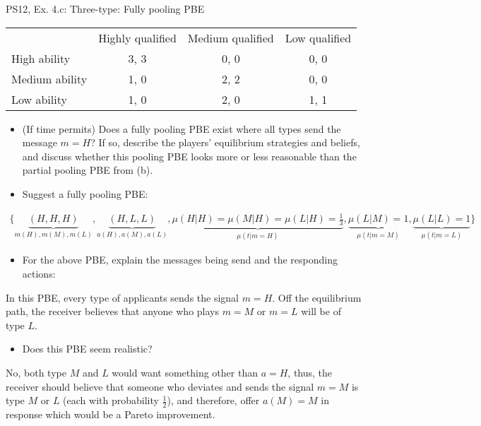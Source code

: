 \begin{frame}{PS12, Ex. 4.c: Three-type: Fully pooling PBE}
    \begin{table}
      \begin{tabular}{l|c|c|c|}
          \multicolumn{1}{c}{} & \multicolumn{1}{c}{Highly qualified} & \multicolumn{1}{c}{Medium qualified} & \multicolumn{1}{c}{Low qualified} \\\cline{2-4}
          High ability   & 3, 3 & 0, 0 & 0, 0 \\\cline{2-4}
          Medium ability & 1, 0 & 2, 2 & 0, 0 \\\cline{2-4}
          Low ability    & 1, 0 & 2, 0 & 1, 1 \\\cline{2-4}
      \end{tabular}
    \end{table}\vspace{-8pt}
    \begin{itemize}
      \item[(c)] (If time permits) Does a fully pooling PBE exist where all types send the message $m = H$? If so, describe the players’ equilibrium strategies and beliefs, and discuss whether this pooling PBE looks more or less reasonable than the partial pooling PBE from (b).
      \item[Step 1:] Suggest a fully pooling PBE:
    \end{itemize}\vspace{-12pt}
    \begin{align*}
      \{\underbrace{(H,H,H)}_{m(H),m(M),m(L)},\underbrace{(H,L,L)}_{a(H),a(M),a(L)},\underbrace{\mu(H|H)=\mu(M|H)=\mu(L|H)=\frac{1}{3}}_{\mu(t|m=H)},\underbrace{\mu(L|M)=1}_{\mu(t|m=M)},\underbrace{\mu(L|L)=1}_{\mu(t|m=L)}\}
    \end{align*}\vspace{-14pt}
    \begin{itemize}
        \item[Step 2:] For the above PBE, explain the messages being send and the responding actions:
    \end{itemize}\vspace{-2pt}
    In this PBE, every type of applicants sends the signal $m=H$. Off the equilibrium path, the receiver believes that anyone who plays $m=M$ or $m=L$ will be of type $L$.\vspace{-2pt}
    \begin{itemize}
        \item[Step 3:] Does this PBE seem realistic?
    \end{itemize}\vspace{-2pt}
    No, both type $M$ and $L$ would want something other than $a=H$, thus, the receiver should believe that someone who deviates and sends the signal $m=M$ is type $M$ or $L$ (each with probability $\frac{1}{2}$), and therefore, offer $a(M)=M$ in response which would be a Pareto improvement.
    \vfill\null
\end{frame}
